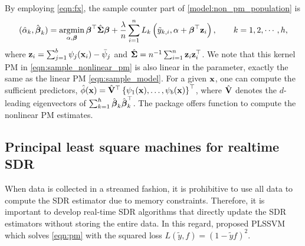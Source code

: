 By employing \eqref{eqn:fx}, the sample counter part of \eqref{model:non_pm_population} is 
\begin{equation}\label{eqn:sample_nonlinear_pm}
(\hat \alpha_k, \hat {\boldsymbol{\beta}}_k) = \mathop{\rm argmin}_{\alpha, \boldsymbol{\beta}} {\boldsymbol{\beta}}^{\top} \hat {\boldsymbol{\Sigma}} {\boldsymbol{\beta}}+\frac{\lambda}{n} 
   \sum_{i=1}^{n} L_{k} \left( \tilde{y}_{k,i}, \alpha + {\boldsymbol{\beta}}^{\top} \mathbf{z}_{i} \right), \qquad k = 1, 2, \cdots, h,   
\end{equation}
where $\mathbf{z}_i = \sum_{j=1}^b \psi_{j}(\mathbf{x}_i)- \bar \psi_j$ and $\hat {\boldsymbol{\Sigma}} = n^{-1} \sum_{i=1}^{n} \boldsymbol{\mathbf{z}}_i \boldsymbol{\mathbf{z}}_i^{\top}$. We note that this kernel PM in \eqref{eqn:sample_nonlinear_pm} is also linear in the parameter, exactly the same as the linear PM \eqref{eqn:sample_model}. 
For a given $\mathbf{x}$, one can compute the sufficient predictors, $\hat{\phi}(\mathbf{x})=\hat{\mathbf{V}}^{\top}\left\{ \psi_1(\mathbf{x}), \ldots,  \psi_b(\mathbf{x})\right\}^{\top}$, where $\hat{\mathbf{V}}$ denotes the $d$-leading eigenvectors of $\sum_{k=1}^h \hat{\boldsymbol{\beta}}_{k} \hat{\boldsymbol{\beta}}_{k}^{\top}$. The  package offers  function to compute the nonlinear PM estimates.

\subsection{Principal least square machines for realtime SDR} \label{sec:rtPSDR}
When data is collected in a streamed fashion, it is prohibitive to use all data to compute the SDR estimator due to memory constraints. Therefore, it is important to develop real-time SDR algorithms that directly update the SDR estimators without storing the entire data. In this regard, \citet{artemiou2021real} proposed PLSSVM which solves \eqref{eqn:pm} with the squared loss $L(\tilde y, f) = (1 - \tilde y f)^2$.

